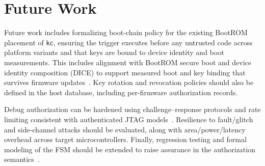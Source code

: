
\section{Future Work}
\label{sec:futurework}

Future work includes formalizing boot-chain policy for the existing BootROM placement
of \texttt{kc}, ensuring the trigger executes before any untrusted code across platform
variants and that keys are bound to device identity and boot measurements. This
includes alignment with BootROM secure boot and device identity composition (DICE) to
support measured boot and key binding that survives firmware
updates~\cite{bin2020bootrom,rv2018securebootreview,jaeger2020diceharder,parno2010bootstrapping}.
Key rotation and revocation policies should also be defined in the host database,
including per-firmware authorization records.

Debug authorization can be hardened using challenge--response protocols and rate
limiting consistent with authenticated JTAG models~\cite{lapeyre2022jtagauth,wang2020schnorrjtag}.
Resilience to fault/glitch and side-channel attacks should be evaluated, along with
area/power/latency overhead across target microcontrollers. Finally, regression
testing and formal modeling of the FSM should be extended to raise assurance in the
authorization semantics~\cite{klein2009sel4}.

